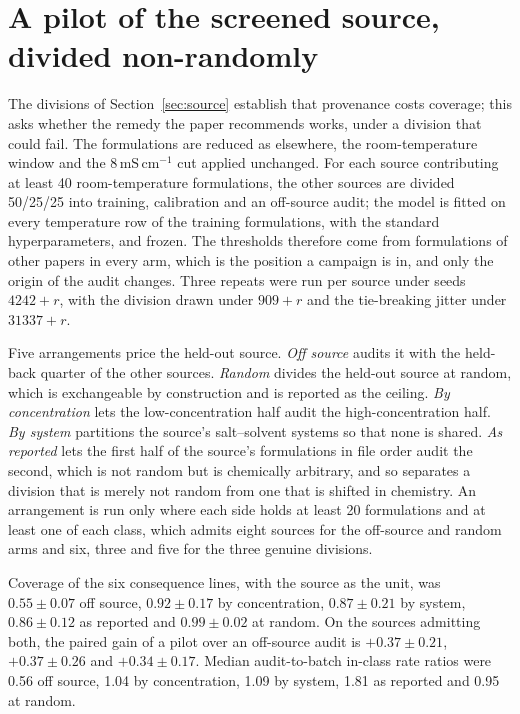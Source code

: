 \documentclass[10pt]{article}
\begin{document}
\section{A pilot of the screened source, divided non-randomly}
\label{sec:pilotnr}

The divisions of Section~\ref{sec:source} establish that provenance costs coverage; this asks
whether the remedy the paper recommends works, under a division that could fail. The
formulations are reduced as elsewhere, the room-temperature window and the
$8\,\mathrm{mS\,cm^{-1}}$ cut applied unchanged. For each source contributing at least 40
room-temperature formulations, the other sources are divided 50/25/25 into training,
calibration and an off-source audit; the model is fitted on every temperature row of the
training formulations, with the standard hyperparameters, and frozen. The thresholds therefore
come from formulations of other papers in every arm, which is the position a campaign is in,
and only the origin of the audit changes. Three repeats were run per source under seeds
$4242+r$, with the division drawn under $909+r$ and the tie-breaking jitter under $31337+r$.

Five arrangements price the held-out source. \emph{Off source} audits it with the held-back
quarter of the other sources. \emph{Random} divides the held-out source at random, which is
exchangeable by construction and is reported as the ceiling. \emph{By concentration} lets the
low-concentration half audit the high-concentration half. \emph{By system} partitions the
source's salt--solvent systems so that none is shared. \emph{As reported} lets the first half
of the source's formulations in file order audit the second, which is not random but is
chemically arbitrary, and so separates a division that is merely not random from one that is
shifted in chemistry. An arrangement is run only where each side holds at least 20
formulations and at least one of each class, which admits eight sources for the off-source and
random arms and six, three and five for the three genuine divisions.

Coverage of the six consequence lines, with the source as the unit, was $0.55\pm0.07$ off
source, $0.92\pm0.17$ by concentration, $0.87\pm0.21$ by system, $0.86\pm0.12$ as reported and
$0.99\pm0.02$ at random. On the sources admitting both, the paired gain of a pilot over an
off-source audit is $+0.37\pm0.21$, $+0.37\pm0.26$ and $+0.34\pm0.17$. Median audit-to-batch
in-class rate ratios were 0.56 off source, 1.04 by concentration, 1.09 by system, 1.81 as
reported and 0.95 at random.
\end{document}
